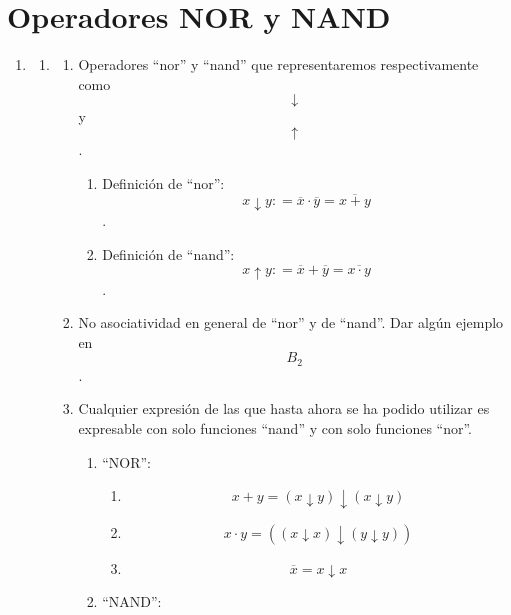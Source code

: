 \chapter{Operadores NOR y NAND}

\begin{enumerate}
\def\labelenumi{\arabic{enumi}.}
\item
  \begin{enumerate}
  \def\labelenumii{\arabic{enumii}.}
  \item
    \begin{enumerate}
    \def\labelenumiii{\arabic{enumiii}.}
    \item
      Operadores ``nor'' y ``nand'' que representaremos respectivamente
      como \[\downarrow\]y \[\uparrow\].

      \begin{enumerate}
      \def\labelenumiv{\arabic{enumiv}.}
      \tightlist
      \item
        Definición de ``nor'':
        \[{x\downarrow y}{: =}{{\overline{x} \cdot \overline{y}} = \overline{x+y}}\].
      \item
        Definición de ``nand'':
        \[{x\uparrow y}{: =}{{\overline{x} + \overline{y}} = \overline{x\cdot y}}\].
      \end{enumerate}
    \item
      No asociatividad en general de ``nor'' y de ``nand''. Dar algún
      ejemplo en \[B_{2}\].
    \item
      Cualquier expresión de las que hasta ahora se ha podido utilizar
      es expresable con solo funciones ``nand'' y con solo funciones
      ``nor''.

      \begin{enumerate}
      \def\labelenumiv{\arabic{enumiv}.}
      \item
        ``NOR'':

        \begin{enumerate}
        \def\labelenumv{\arabic{enumv}.}
        \tightlist
        \item
          \[{{x + y} = {({x\downarrow y})}}\downarrow{({x\downarrow y})}\]
        \item
          \[{x \cdot y} = {({{({x\downarrow x})}}\downarrow{({y\downarrow y})})}\]
        \item
          \[\overline{x} = {x\downarrow x}\]
        \end{enumerate}
      \item
        ``NAND'':


\end{enumerate}
\end{enumerate}
\end{enumerate}
\end{enumerate}
